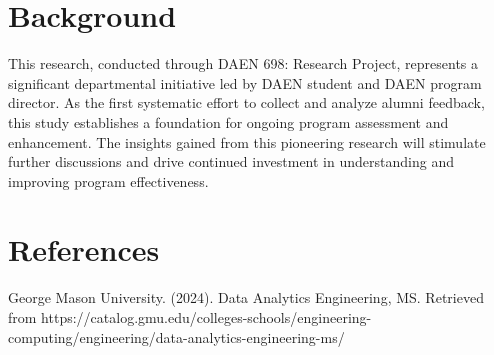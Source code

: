 \documentclass[12pt,a4paper]{article}
\begin{document}
\begin{appendices}
\section{Background}
This research, conducted through DAEN 698: Research Project, represents a significant departmental initiative led by DAEN student and DAEN program director. As the first systematic effort to collect and analyze alumni feedback, this study establishes a foundation for ongoing program assessment and enhancement. The insights gained from this pioneering research will stimulate further discussions and drive continued investment in understanding and improving program effectiveness.

\section{References}
\begin{thebibliography}{9}
     George Mason University. (2024). Data Analytics Engineering, MS. Retrieved from https://catalog.gmu.edu/colleges-schools/engineering-computing/engineering/data-analytics-engineering-ms/
    \end{thebibliography}
\end{appendices}
\end{document}

